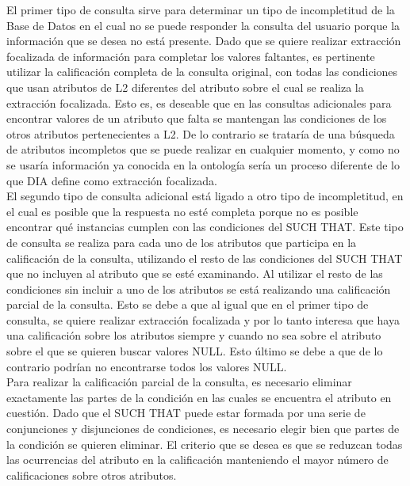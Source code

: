 El primer tipo de consulta sirve para determinar un tipo de incompletitud de la Base de Datos en el cual no se puede responder la consulta del usuario porque la información que se desea no está presente. Dado que se quiere realizar extracción focalizada de información para completar los valores faltantes, es pertinente utilizar la calificación completa de la consulta original, con todas las condiciones que usan atributos de L2 diferentes del atributo sobre el cual se realiza la extracción focalizada. Esto es, es deseable que en las consultas adicionales para encontrar valores de un atributo que falta se mantengan las condiciones de los otros atributos pertenecientes a L2. De lo contrario se trataría de una búsqueda de atributos incompletos que se puede realizar en cualquier momento, y como no se usaría información ya conocida en la ontología sería un proceso diferente de lo que DIA define como extracción focalizada. \\

El segundo tipo de consulta adicional está ligado a otro tipo de incompletitud, en el cual es posible que la respuesta no esté completa porque no es posible encontrar qué instancias cumplen con las condiciones del SUCH THAT. Este tipo de consulta se realiza para cada uno de los atributos que participa en la calificación de la consulta, utilizando el resto de las condiciones del SUCH THAT que no incluyen al atributo que se esté examinando. Al utilizar el resto de las condiciones sin incluir a uno de los atributos se está realizando una calificación parcial de la consulta. Esto se debe a que al igual que en el primer tipo de consulta, se quiere realizar extracción focalizada y por lo tanto interesa que haya una calificación sobre los atributos siempre y cuando no sea sobre el atributo sobre el que se quieren buscar valores NULL. Esto último se debe a que de lo contrario podrían no encontrarse todos los valores NULL. \\

Para realizar la calificación parcial de la consulta, es necesario eliminar exactamente las partes de la condición en las cuales se encuentra el atributo en cuestión. Dado que el SUCH THAT puede estar formada por una serie de conjunciones y disjunciones de condiciones, es necesario elegir bien que partes de la condición se quieren eliminar. El criterio que se desea es que se reduzcan todas las ocurrencias del atributo en la calificación manteniendo el mayor número de calificaciones sobre otros atributos.\\

